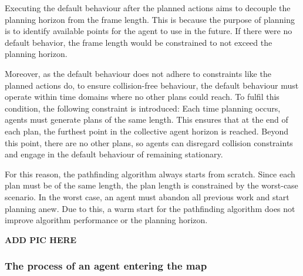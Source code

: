 Executing the default behaviour after the planned actions aims to decouple the planning horizon from the frame length. This is because the purpose of planning is to identify available points for the agent to use in the future. If there were no default behavior, the frame length would be constrained to not exceed the planning horizon.

Moreover, as the default behaviour does not adhere to constraints like the planned actions do, to ensure collision-free behaviour, the default behaviour must operate within time domains where no other plans could reach.
To fulfil this condition, the following constraint is introduced: Each time planning occurs, agents must generate plans of the same length. 
This ensures that at the end of each plan, the furthest point in the collective agent horizon is reached. Beyond this point, there are no other plans, so agents can disregard collision constraints and engage in the default behaviour of remaining stationary.

For this reason, the pathfinding algorithm always starts from scratch. Since each plan must be of the same length, the plan length is constrained by the worst-case scenario. In the worst case, an agent must abandon all previous work and start planning anew. Due to this, a warm start for the pathfinding algorithm does not improve algorithm performance or the planning horizon.

\textbf{ADD PIC HERE} %

\subsubsection{The process of an agent entering the map}
\label{chap:join map}

